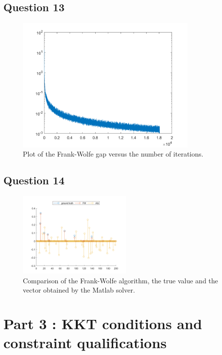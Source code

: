 \documentclass[12p]{article}
\begin{document}
\subsection*{Question 13} 


\begin{figure}[h]
    \centering
    \includegraphics[width=0.8\textwidth]{gaps.png}
    \caption{Plot of the Frank-Wolfe gap versus the number of iterations.}
    \label{fig:my_label}
\end{figure}
\pagebreak
\subsection*{Question 14} 
\begin{figure}[h]
    \centering
    \includegraphics[width=0.5\textwidth]{compare.png}
    \caption{Comparison of the Frank-Wolfe algorithm, the true value and the vector obtained by the Matlab solver.}
    \label{fig:next}
\end{figure}

\pagebreak


\section*{Part 3 : KKT conditions and constraint qualifications}
\end{document}
